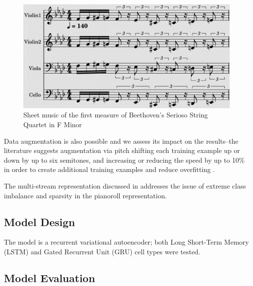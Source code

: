 \documentclass[sigconf,authorversion]{acmart}
\begin{document}
\begin{figure}[h]
  \centering
  \includegraphics[width=\linewidth]{first_bar_sheet.png}
  \caption{Sheet music of the first measure of Beethoven's Serioso
    String Quartet in F Minor}
  \label{sheet}
\end{figure}


Data augmentation is also possible and we assess its impact on
the results--the literature suggests augmentation via pitch shifting
each training example up or down by up to six semitones, and
increasing or reducing the speed by up to 10\% in order to create
additional training examples and reduce overfitting
\cite{oore_this_2018}.

The multi-stream representation discussed in
\cite{kumar2019polyphonic} addresses the issue of extreme class
imbalance and sparsity in the pianoroll representation.

\subsection{Model Design}

The model is a recurrent variational autoencoder; both Long Short-Term
Memory (LSTM) and Gated Recurrent Unit (GRU) cell types were tested.



\subsection{Model Evaluation}
\end{document}
